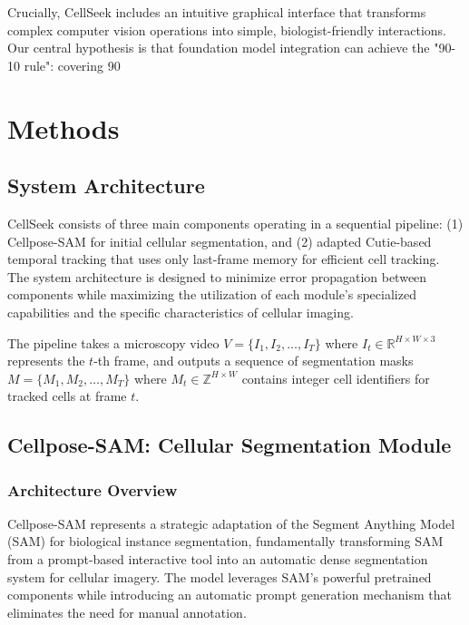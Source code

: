 \documentclass[12pt]{article}
\begin{document}
Crucially, CellSeek includes an intuitive graphical interface that transforms complex computer vision operations into simple, biologist-friendly interactions. Our central hypothesis is that foundation model integration can achieve the "90-10 rule": covering 90%

\section{Methods}

\subsection{System Architecture}

CellSeek consists of three main components operating in a sequential pipeline: (1) Cellpose-SAM for initial cellular segmentation, and (2) adapted Cutie-based temporal tracking that uses only last-frame memory for efficient cell tracking. The system architecture is designed to minimize error propagation between components while maximizing the utilization of each module's specialized capabilities and the specific characteristics of cellular imaging.

The pipeline takes a microscopy video $V = \{I_1, I_2, \ldots, I_T\}$ where $I_t \in \mathbb{R}^{H \times W \times 3}$ represents the $t$-th frame, and outputs a sequence of segmentation masks $M = \{M_1, M_2, \ldots, M_T\}$ where $M_t \in \mathbb{Z}^{H \times W}$ contains integer cell identifiers for tracked cells at frame $t$.

\subsection{Cellpose-SAM: Cellular Segmentation Module}

\subsubsection{Architecture Overview}

Cellpose-SAM represents a strategic adaptation of the Segment Anything Model (SAM) for biological instance segmentation, fundamentally transforming SAM from a prompt-based interactive tool into an automatic dense segmentation system for cellular imagery. The model leverages SAM's powerful pretrained components while introducing an automatic prompt generation mechanism that eliminates the need for manual annotation.
\end{document}
